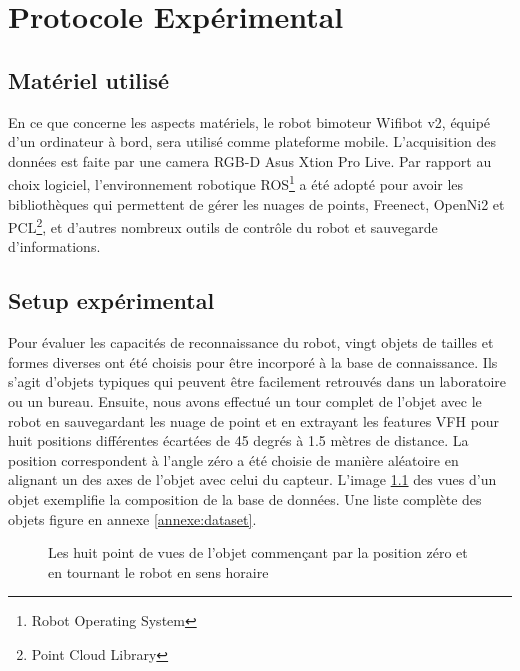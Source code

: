 \chapter {Protocole Expérimental}

\section{Matériel utilisé}
En ce que concerne les aspects matériels, le robot bimoteur Wifibot v2, équipé d'un ordinateur à bord, sera utilisé comme plateforme mobile. L'acquisition des données est faite par une camera RGB-D Asus Xtion Pro Live. Par rapport au choix logiciel, l'environnement robotique ROS\footnote{Robot Operating System} a été adopté pour avoir les bibliothèques qui permettent de gérer les nuages de points, Freenect, OpenNi2 et PCL\footnote{Point Cloud Library}, et d'autres nombreux outils de contrôle du robot et sauvegarde d'informations.

\section{Setup expérimental}
Pour évaluer les capacités de reconnaissance du robot, vingt objets de tailles et formes diverses ont été choisis pour être incorporé à la base de connaissance. Ils s'agit d'objets typiques qui peuvent être facilement retrouvés dans un laboratoire ou un bureau. Ensuite, nous avons effectué un tour complet de l'objet avec le robot en sauvegardant les nuage de point et en extrayant les features VFH pour huit positions différentes écartées de 45 degrés à 1.5 mètres de distance. La position correspondent à l'angle zéro a été choisie de manière aléatoire en alignant un des axes de l'objet avec celui du capteur. L'image \ref{fig:setup_expe} des vues d'un objet exemplifie la composition de la base de données. Une liste complète des objets figure en annexe \ref{annexe:dataset}.

\begin{figure}[H]
	\caption{Les huit point de vues de l'objet commençant par la position zéro et en tournant le robot en sens horaire}
	\label{fig:setup_expe}
\end{figure}

